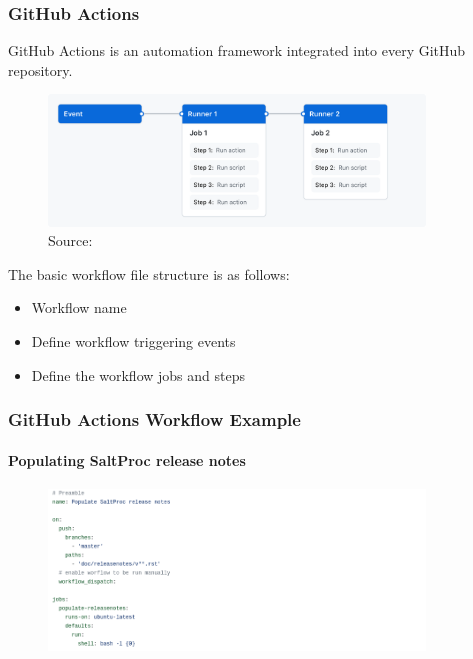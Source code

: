 \begin{frame}
    \frametitle{GitHub Actions}
    
    GitHub Actions is an automation framework integrated into every GitHub repository.

    \begin{figure}[htpb]
        \centering
        \includegraphics[width=10cm]{images/overview-actions-simple}
        \newline
        {\tiny Source: \cite{github_actions_conceptual_example}}
    \end{figure}

    The basic workflow file structure is as follows:
    \begin{itemize}
        \item Workflow name
        \item Define workflow triggering events
        \item Define the workflow jobs and steps
    \end{itemize}

\end{frame}

\begin{frame}
    \frametitle{GitHub Actions Workflow Example}
    \framesubtitle{Populating SaltProc release notes}

    \begin{figure}[htpb]
        \centering
        \includegraphics[width=10cm]{images/github_actions_workflow_ex1}
    \end{figure}

\end{frame}


